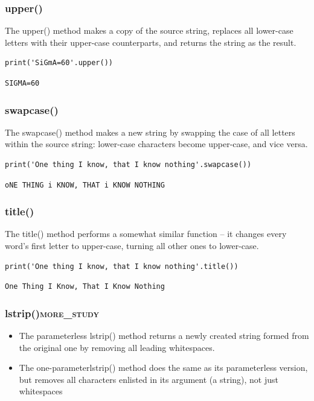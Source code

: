 \documentclass[11pt]{article}
\begin{document}
\subsubsection{upper()}
\label{sec:org0688f54}
The upper() method makes a copy of the source string, replaces all
lower-case letters with their upper-case counterparts, and returns the
string as the result.

\begin{verbatim}
print('SiGmA=60'.upper())
\end{verbatim}

\begin{verbatim}
SIGMA=60
\end{verbatim}

\subsubsection{swapcase()}
\label{sec:orgb93e623}
The swapcase() method makes a new string by swapping the case of all
letters within the source string: lower-case characters become
upper-case, and vice versa.

\begin{verbatim}
print('One thing I know, that I know nothing'.swapcase())
\end{verbatim}

\begin{verbatim}
oNE THING i KNOW, THAT i KNOW NOTHING
\end{verbatim}

\subsubsection{title()}
\label{sec:org97021e6}
The title() method performs a somewhat similar function – it changes
every word’s first letter to upper-case, turning all other ones to
lower-case.

\begin{verbatim}
print('One thing I know, that I know nothing'.title())
\end{verbatim}

\begin{verbatim}
One Thing I Know, That I Know Nothing
\end{verbatim}

\subsubsection{lstrip()\hfill{}\textsc{more\_study}}
\label{sec:orgd7fdf34}
\begin{itemize}
\item The parameterless lstrip() method returns a newly created string
formed from the original one by removing all leading whitespaces.
\item The one-parameterlstrip() method does the same as its parameterless
version, but removes all characters enlisted in its argument (a
string), not just whitespaces
\end{itemize}
\end{document}
